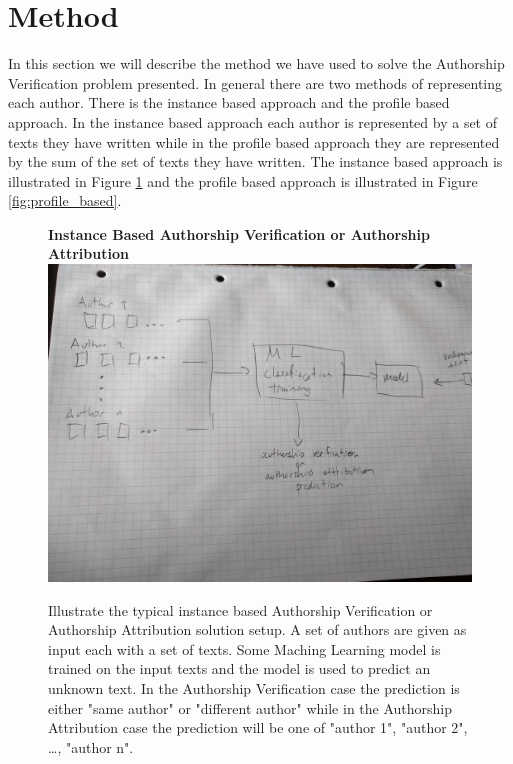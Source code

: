\section{Method} \label{sec:method} 

In this section we will describe the method we have used to solve the Authorship
Verification problem presented. In general there are two methods of representing
each author. There is the instance based approach and the profile based
approach. In the instance based approach each author is represented by a set of
texts they have written while in the profile based approach they are represented
by the sum of the set of texts they have written. The instance based approach is
illustrated in Figure \ref{fig:instance_based} and the profile based approach is
illustrated in Figure \ref{fig:profile_based}.

\begin{figure}[htb]
    \centering
    \textbf{Instance Based Authorship Verification or Authorship Attribution}
    \includegraphics[width=\textwidth]{./graphs/method/instance_based.jpg}
    \caption{Illustrate the typical instance based Authorship Verification or
        Authorship Attribution solution setup. A set of authors are given as
        input each with a set of texts. Some Maching Learning model is trained
        on the input texts and the model is used to predict an unknown text. In
        the Authorship Verification case the prediction is either "same author"
        or "different author" while in the Authorship Attribution case the
        prediction will be one of "author 1", "author 2", \dots, "author n".}
    \label{fig:instance_based}
\end{figure}

